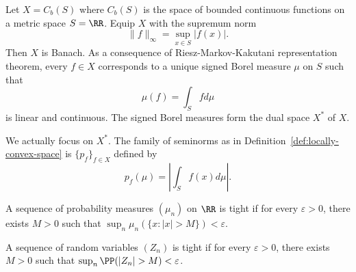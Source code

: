 Let $X=C_b(S)$ where $C_b(S)$ is the space of bounded continuous functions on a metric space $S=\RR$. Equip $X$ with the supremum norm
$$\|f\|_\infty = \sup_{x\in S}|f(x)|.$$
Then $X$ is Banach. As a consequence of Riesz-Markov-Kakutani representation theorem, every $f\in X$ corresponds to a unique signed Borel measure $\mu$ on $S$ such that
$$\mu(f) = \int_S f d\mu$$
is linear and continuous. The signed Borel measures form the dual space $X^*$ of $X$.

We actually focus on $X^*$. The family of seminorms as in Definition~\ref{def:locally-convex-space} is $\{p_f\}_{f\in X}$ defined by
$$p_f(\mu) = \left|\int_S f(x) d\mu\right|.$$


\begin{definition}[Tightness]
  \label{def:tight}
  A sequence of probability measures $(\mu_n)$ on $\RR$ is tight if for every $\varepsilon > 0$, there exists $M > 0$ such that $\sup_n \mu_n(\{x: |x| > M\}) < \varepsilon$.

  A sequence of random variables $(Z_n)$ is tight if for every $\varepsilon > 0$, there exists $M > 0$ such that $\sup_n\PP(|Z_n| > M) < \varepsilon$.
\end{definition}